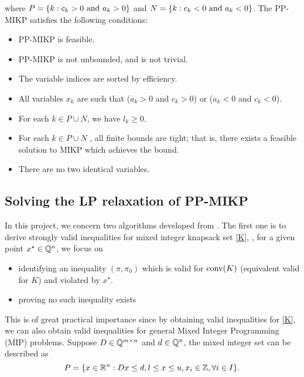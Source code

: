 \documentclass[a4paper,11pt]{article}
\begin{document}
where $P=\{k: c_k>0~\mbox{and}~ a_k>0\}$ and $N=\{k: c_k<0~\mbox{and}~ a_k<0\}$. The PP-MIKP satisfies the following conditions:
\begin{itemize}
\item  PP-MIKP is feasible.
\item  PP-MIKP is not unbounded, and is not trivial.
\item  The variable indices are sorted by efficiency. 
\item  All variables $x_k$ are such that ($a_k >0$ and $c_k >0$) or ($a_k <0$ and $c_k <0$). 
\item For each $k\in P\cup N$, we have $l_k ≥0$.
\item For each $k \in P \cup N$ , all finite bounds are tight; that is, there exists a feasible solution to MIKP which achieves the bound.
\item There are no two identical variables.
\end{itemize}

\subsection{Solving the LP relaxation of PP-MIKP}






















\iffalse
In this project, we concern two algorithms developed from \cite{fukasawa2011exact}. The first one is to derive strongly valid inequalities for mixed integer knapsack set \eqref{K}, \ie, for a given 
point $x^\star\in \mathbb{Q}^n$, we focus on
\begin{itemize}
 \item identifying an inequality $(\pi,\pi_0)$ which is valid for $\operatorname{conv}(K)$ (equivalent valid for $K$) and violated by $x^\star$.
 \item proving no such inequality exists
\end{itemize}

This is of great practical importance since by obtaining valid inequalities for \eqref{K}, we can also obtain valid inequalities for general Mixed Integer Programming 
(MIP) problems. Suppose $D\in \mathbb{Q}^{m\times n}$ and $d\in \mathbb{Q}^n$, the mixed integer set can be described as
\begin{equation}\label{P}
 P=\{x\in \mathbb{R}^n: Dx\leq d, l\leq x\leq u, x_i\in \mathbb{Z}, \forall i \in I\}.
\end{equation}
\end{document}
